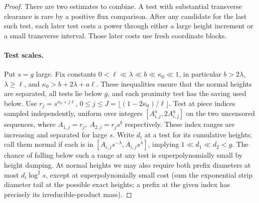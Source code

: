 \begin{proof}
There are two estimates to combine. A test with substantial transverse
clearance is rare by a positive flux comparison. After any candidate for
the last such test, each later test costs a power through either a large
height increment or a small transverse interval. Those later costs use
fresh coordinate blocks.

\paragraph{Test scales.}
Put $s=g$ large. Fix constants $0<\ell\ll\lambda\ll b\ll\kappa_0\ll1$, in particular
$b>2\lambda$, $\lambda\ge\ell$, and
$\kappa_0>b+2\lambda+a\ell$. These inequalities ensure that the normal
heights are separated, all tests lie below $g$, and each proximity test has
the saving used below. Use \(r_j=s^{\kappa_0+j\ell}\), \(0\le j\le J=\lfloor(1-2\kappa_0)/\ell\rfloor\). Test at piece indices sampled independently, uniform over integers \([A_{i,j}^a,2A_{i,j}^a]\) on the two uncensored sequences, where \(A_{1,j}=r_j,\ A_{2,j}=r_j s^b\) respectively. These index ranges are increasing and separated for large \(s\). Write \(d_i\) at a test for its cumulative heights; call them normal if each is in \([A_{i,j}s^{-\lambda}, A_{i,j}s^\lambda]\), implying \(1\ll d_1\ll d_2<g\). The chance of falling below such a range at any test is superpolynomially small by height damping. At normal heights we may also require both prefix diameters at most \(d_i\log^2 s\), except at superpolynomially small cost (sum the exponential strip diameter tail at the possible exact heights; a prefix at the given index has precisely its irreducible-product mass).


\end{proof}
